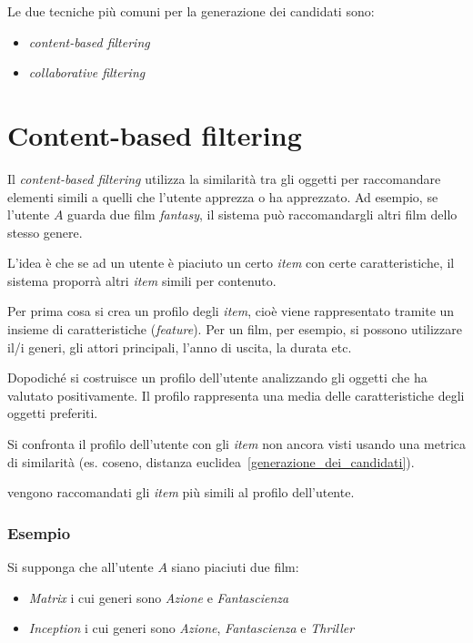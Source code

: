 Le due tecniche più comuni per la generazione dei candidati sono:

\begin{itemize}
    \item \textit{content-based filtering}
    \item \textit{collaborative filtering}
\end{itemize}
  
\section{Content-based filtering}
Il \textit{content-based filtering} utilizza la similarità tra gli oggetti per raccomandare elementi simili a quelli che l'utente apprezza o ha apprezzato. Ad esempio, se l'utente $A$ guarda due film \textit{fantasy}, il sistema può raccomandargli altri film dello stesso genere.

L'idea è che se ad un utente è piaciuto un certo \textit{item} con certe caratteristiche, il sistema proporrà altri \textit{item} simili per contenuto.

Per prima cosa si crea un profilo degli \textit{item}, cioè viene rappresentato tramite un insieme di caratteristiche (\textit{feature}). Per un film, per esempio, si possono utilizzare il/i generi, gli attori principali, l'anno di uscita, la durata etc.

Dopodiché si costruisce un profilo dell'utente analizzando gli oggetti che ha valutato positivamente. Il profilo rappresenta una media delle caratteristiche degli oggetti preferiti.

Si confronta il profilo dell'utente con gli \textit{item} non ancora visti usando una metrica di similarità (es. coseno, distanza euclidea~\ref{generazione_dei_candidati}).

vengono raccomandati gli \textit{item} più simili al profilo dell'utente.

\subsubsection{Esempio}

Si supponga che all'utente $A$ siano piaciuti due film:

\begin{itemize}
    \item \textit{Matrix} i cui generi sono \textit{Azione} e \textit{Fantascienza}
    \item \textit{Inception} i cui generi sono \textit{Azione}, \textit{Fantascienza} e \textit{Thriller}
\end{itemize}


